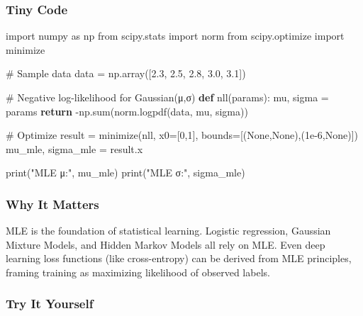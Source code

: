 \documentclass[
  letterpaper,
  DIV=11,
  numbers=noendperiod]{scrreprt}
\newenvironment{Shaded}{\begin{snugshade}}{\end{snugshade}}
\newcommand{\BuiltInTok}[1]{\textcolor[rgb]{0.00,0.23,0.31}{#1}}
\newcommand{\CommentTok}[1]{\textcolor[rgb]{0.37,0.37,0.37}{#1}}
\newcommand{\ControlFlowTok}[1]{\textcolor[rgb]{0.00,0.23,0.31}{\textbf{#1}}}
\newcommand{\DecValTok}[1]{\textcolor[rgb]{0.68,0.00,0.00}{#1}}
\newcommand{\FloatTok}[1]{\textcolor[rgb]{0.68,0.00,0.00}{#1}}
\newcommand{\ImportTok}[1]{\textcolor[rgb]{0.00,0.46,0.62}{#1}}
\newcommand{\KeywordTok}[1]{\textcolor[rgb]{0.00,0.23,0.31}{\textbf{#1}}}
\newcommand{\NormalTok}[1]{\textcolor[rgb]{0.00,0.23,0.31}{#1}}
\newcommand{\OperatorTok}[1]{\textcolor[rgb]{0.37,0.37,0.37}{#1}}
\newcommand{\StringTok}[1]{\textcolor[rgb]{0.13,0.47,0.30}{#1}}
\newcommand{\VariableTok}[1]{\textcolor[rgb]{0.07,0.07,0.07}{#1}}
\begin{document}
\subsubsection{Tiny Code}\label{tiny-code-133}

\begin{Shaded}
\begin{Highlighting}[]
\ImportTok{import}\NormalTok{ numpy }\ImportTok{as}\NormalTok{ np}
\ImportTok{from}\NormalTok{ scipy.stats }\ImportTok{import}\NormalTok{ norm}
\ImportTok{from}\NormalTok{ scipy.optimize }\ImportTok{import}\NormalTok{ minimize}

\CommentTok{\# Sample data}
\NormalTok{data }\OperatorTok{=}\NormalTok{ np.array([}\FloatTok{2.3}\NormalTok{, }\FloatTok{2.5}\NormalTok{, }\FloatTok{2.8}\NormalTok{, }\FloatTok{3.0}\NormalTok{, }\FloatTok{3.1}\NormalTok{])}

\CommentTok{\# Negative log{-}likelihood for Gaussian(μ,σ)}
\KeywordTok{def}\NormalTok{ nll(params):}
\NormalTok{    mu, sigma }\OperatorTok{=}\NormalTok{ params}
    \ControlFlowTok{return} \OperatorTok{{-}}\NormalTok{np.}\BuiltInTok{sum}\NormalTok{(norm.logpdf(data, mu, sigma))}

\CommentTok{\# Optimize}
\NormalTok{result }\OperatorTok{=}\NormalTok{ minimize(nll, x0}\OperatorTok{=}\NormalTok{[}\DecValTok{0}\NormalTok{,}\DecValTok{1}\NormalTok{], bounds}\OperatorTok{=}\NormalTok{[(}\VariableTok{None}\NormalTok{,}\VariableTok{None}\NormalTok{),(}\FloatTok{1e{-}6}\NormalTok{,}\VariableTok{None}\NormalTok{)])}
\NormalTok{mu\_mle, sigma\_mle }\OperatorTok{=}\NormalTok{ result.x}

\BuiltInTok{print}\NormalTok{(}\StringTok{"MLE μ:"}\NormalTok{, mu\_mle)}
\BuiltInTok{print}\NormalTok{(}\StringTok{"MLE σ:"}\NormalTok{, sigma\_mle)}
\end{Highlighting}
\end{Shaded}

\subsubsection{Why It Matters}\label{why-it-matters-31}

MLE is the foundation of statistical learning. Logistic regression,
Gaussian Mixture Models, and Hidden Markov Models all rely on MLE. Even
deep learning loss functions (like cross-entropy) can be derived from
MLE principles, framing training as maximizing likelihood of observed
labels.

\subsubsection{Try It Yourself}\label{try-it-yourself-133}
\end{document}

